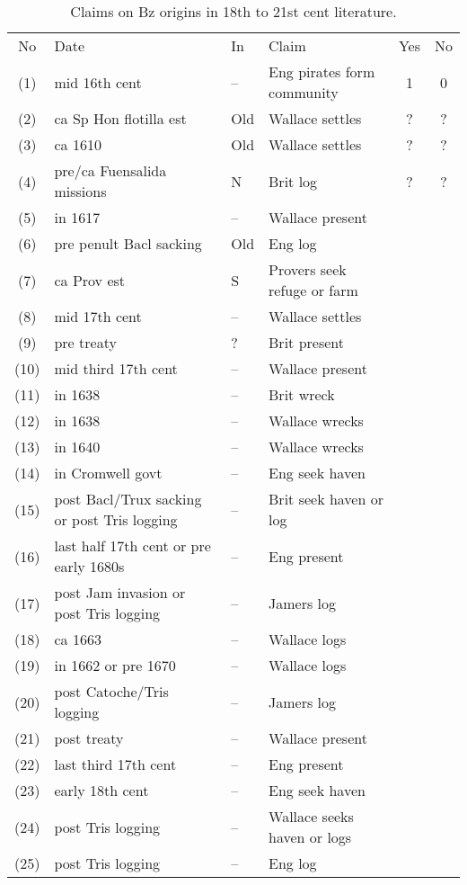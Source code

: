 \documentclass{amsart}
\theoremstyle{definition}%
\theoremstyle{definition}%
\theoremstyle{remark}%
\begin{document}
\begin{table}%
\caption{Claims on Bz origins in 18th to 21st cent literature.}
\label{tab1}
\begin{sideways}
\begin{tabular}{cp{.4\textheight}lp{.3\textheight}cc}
No	&Date	&In	&Claim	&Yes	&No\\
(1)	&mid 16th cent	&--	&Eng pirates form community	&1	&0\\%
(2)	&ca Sp Hon flotilla est	&Old	&Wallace settles	&?	&?\\%
(3)	&ca 1610	&Old&Wallace settles	&?	&?\\%
(4)	&pre/ca Fuensalida missions	&N	&Brit log	&?	&?\\%
(5)	&in 1617	&--	&Wallace present&&\\%
(6)	&pre penult Bacl sacking	&Old	&Eng log	&&\\%
(7)	&ca Prov est	&S	&Provers seek refuge or farm	&&\\%
(8)	&mid 17th cent	&--	&Wallace settles	&&\\%
(9)	&pre treaty	&?	&Brit present	&&\\%
(10)	&mid third 17th cent	&--	&Wallace present	&&\\%
(11)	&in 1638	&--	&Brit wreck	&&\\%
(12)	&in 1638	&--	&Wallace wrecks	&&\\%
(13)	&in 1640	&--	&Wallace wrecks	&&\\%
(14)	&in Cromwell govt	&--	&Eng seek haven	&&\\%
(15)	&post Bacl/Trux sacking or post Tris logging	&--	&Brit seek haven or log	&&\\%
(16)	&last half 17th cent or pre early 1680s	&--	&Eng present	&&\\%
(17)	&post Jam invasion or post Tris logging	&--	&Jamers log	&&\\%
(18)	&ca 1663	&--	&Wallace logs	&&\\%
(19)	&in 1662	 or pre 1670&--	&Wallace logs	&&\\%
(20)	&post Catoche/Tris logging	&--	&Jamers log	&&\\%
(21)	&post treaty	&--	&Wallace present	&&\\%
(22)	&last third 17th cent	&--	&Eng present	&&\\%
(23)	&early 18th cent	&--	&Eng seek haven	&&\\%
(24)	&post Tris logging	&--	&Wallace seeks haven or logs	&&\\%
(25)	&post Tris logging	&--	&Eng log	&&%
\end{tabular}
\end{sideways}
\end{table}
%
%
\end{document}
